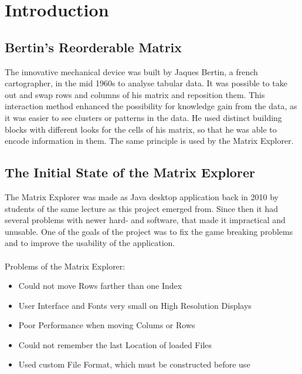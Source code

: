 %
%
% 
% 
% 


\chapter{Introduction}

\label{chap:Intro}


\section{Bertin's Reorderable Matrix}

The innovative mechanical device was built by Jaques Bertin, a french cartographer, in the mid 1960s to analyse tabular data. It was possible to take out and swap rows and columns of his matrix and reposition them. This interaction method enhanced the possibility for knowledge gain from the data, as it was easier to see clusters or patterns in the data. He used distinct building blocks with different looks for the cells of his matrix, so that he was able to encode information in them. The same principle is used by the Matrix Explorer.%



\section{The Initial State of the Matrix Explorer}
\label{sec:initial-state}

The Matrix Explorer was made as Java desktop application back in 2010 by students of the same lecture as this project emerged from. Since then it had several problems with newer hard- and software, that made it impractical and unusable. One of the goals of the project was to fix the game breaking problems and to improve the usability of the application.\\\\

Problems of the Matrix Explorer:
\begin{itemize}
	\item Could not move Rows farther than one Index
	\item User Interface and Fonts very small on High Resolution Displays
	\item Poor Performance when moving Colums or Rows
	\item Could not remember the last Location of loaded Files
	\item Used custom File Format, which must be constructed before use
\end{itemize}


